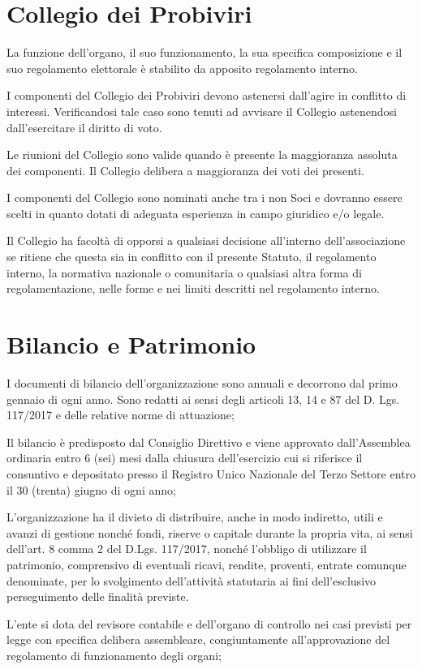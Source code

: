 \documentclass[legalpaper, 11pt]{exam}
\let\tempone\enumerate
\let\temptwo\endenumerate
\renewenvironment{enumerate}{\tempone\addtolength{\itemsep}{-0.45\baselineskip}}{\temptwo}
\begin{document}
{\section{Collegio dei Probiviri}
\begin{enumerate}
 \item La funzione dell’organo, il suo funzionamento, la sua specifica composizione e il suo regolamento elettorale è stabilito da apposito regolamento interno.
 \item I componenti del Collegio dei Probiviri devono astenersi dall’agire in conflitto di interessi. Verificandosi tale caso sono tenuti ad avvisare il Collegio astenendosi dall’esercitare il diritto di voto.
 \item Le riunioni del Collegio sono valide quando è presente la maggioranza assoluta dei componenti. Il Collegio delibera a maggioranza dei voti dei presenti.
 \item I componenti del Collegio sono nominati anche tra i non Soci e dovranno essere scelti in quanto dotati di adeguata esperienza in campo giuridico e/o legale.
 \item Il Collegio ha facoltà di opporsi a qualsiasi decisione all'interno dell'associazione se ritiene che questa sia in conflitto con il presente Statuto, il regolamento interno, la normativa nazionale o comunitaria o qualsiasi altra forma di regolamentazione, nelle forme e nei limiti descritti nel regolamento interno.
\end{enumerate}

\section{Bilancio e Patrimonio}
\begin{enumerate}
 \item I documenti di bilancio dell’organizzazione sono annuali e decorrono dal primo gennaio di ogni anno. Sono redatti ai sensi degli articoli 13, 14 e 87 del D. Lgs. 117/2017 e delle relative norme di attuazione;
 \item Il bilancio è predisposto dal Consiglio Direttivo e viene approvato dall’Assemblea ordinaria entro 6 (sei) mesi dalla chiusura dell’esercizio cui si riferisce il consuntivo e depositato presso il Registro Unico Nazionale del Terzo Settore entro il 30 (trenta) giugno di ogni anno;
 \item L’organizzazione ha il divieto di distribuire, anche in modo indiretto, utili e avanzi di gestione nonché fondi, riserve o capitale durante la propria vita, ai sensi dell’art. 8 comma 2 del D.Lgs. 117/2017, nonché l’obbligo di utilizzare il patrimonio, comprensivo di eventuali ricavi, rendite, proventi, entrate comunque denominate, per lo svolgimento dell’attività statutaria ai fini dell’esclusivo perseguimento delle finalità previste.
 \item L’ente si dota del revisore contabile e dell’organo di controllo nei casi previsti per legge con specifica delibera assembleare, congiuntamente all’approvazione del regolamento di funzionamento degli organi;
 

\end{enumerate}}
\end{document}
